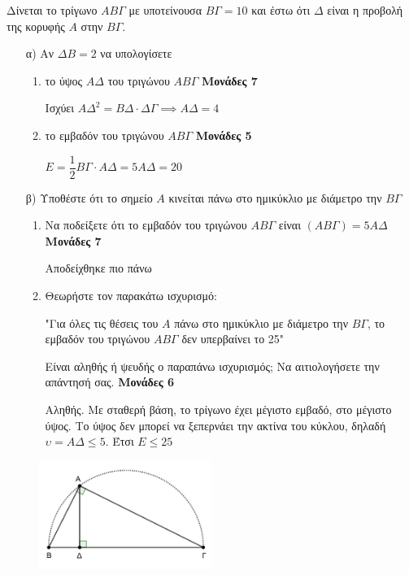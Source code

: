 \documentclass[12pt]{extarticle}
\begin{document}
Δίνεται το τρίγωνο $ΑΒΓ$ με υποτείνουσα $ΒΓ=10$ και έστω ότι $Δ$ είναι η προβολή της κορυφής $Α$ στην $ΒΓ$.
\begin{enumerate}
    \item[α)] Αν $ΔΒ=2$ να υπολογίσετε
        \begin{enumerate}
            \item το ύψος $ΑΔ$ του τριγώνου $ΑΒΓ$ \hspace*{\fill} \textbf{Μονάδες 7}

                  Ισχύει $ΑΔ^2=ΒΔ\cdot ΔΓ \implies ΑΔ=4$
            \item το εμβαδόν του τριγώνου $ΑΒΓ$ \hspace*{\fill} \textbf{Μονάδες 5}

                  $Ε=\dfrac{1}{2}ΒΓ\cdot ΑΔ = 5ΑΔ = 20$
        \end{enumerate}

    \item[β)] Υποθέστε ότι το σημείο $Α$ κινείται πάνω στο ημικύκλιο με διάμετρο την $ΒΓ$
        \begin{enumerate}
            \item Να ποδείξετε ότι το εμβαδόν του τριγώνου $ΑΒΓ$ είναι $(ΑΒΓ)=5ΑΔ$ \hspace*{\fill} \textbf{Μονάδες 7}

                  Αποδείχθηκε πιο πάνω
            \item Θεωρήστε τον παρακάτω ισχυρισμό:

                  "Για όλες τις θέσεις του $Α$ πάνω στο ημικύκλιο με διάμετρο την $ΒΓ$, το εμβαδόν του τριγώνου $ΑΒΓ$ δεν υπερβαίνει το 25"

                  Είναι αληθής ή ψευδής ο παραπάνω ισχυρισμός; Να αιτιολογήσετε την απάντησή σας. \hspace*{\fill} \textbf{Μονάδες 6}


                  Αληθής. Με σταθερή βάση, το τρίγωνο έχει μέγιστο εμβαδό, στο μέγιστο ύψος. Το ύψος δεν μπορεί να ξεπερνάει την ακτίνα του κύκλου, δηλαδή $υ=ΑΔ \le 5$. Έτσι $Ε\le 25$
        \end{enumerate}
\end{enumerate}
\begin{figure}[h]

    \centering
    \includegraphics[width=0.50\textwidth]{2023(4)}
\end{figure}
\end{document}
